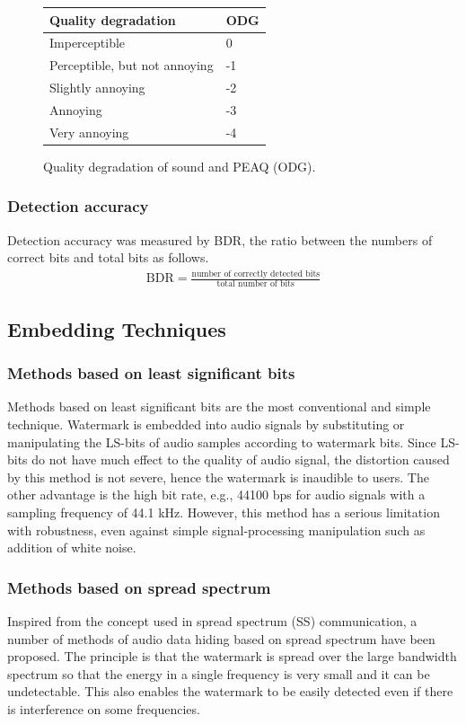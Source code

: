 \begin{figure}
\begin{center}
\begin{tabular}{ | m{6cm} | m{1cm} | } 
\hline
Quality degradation & ODG \\ 
\hline
Imperceptible & 0 \\ 
\hline
Perceptible, but not annoying & -1 \\ 
\hline
Slightly annoying & -2 \\ 
\hline
Annoying & -3 \\ 
\hline
Very annoying & -4 \\ 
\hline
\end{tabular}
\caption{Quality degradation of sound and PEAQ (ODG).}
\label{tab:PEAQ}
\end{center}
\end{figure}


\subsubsection*{Detection accuracy}
Detection accuracy was measured by BDR, the ratio between the numbers of correct bits and total bits as follows.
\begin{align}
\mbox{BDR} = \frac{\mbox{number of correctly detected bits}}{\mbox{total number of bits}}
\end{align}

\subsection{Embedding Techniques}
\subsubsection*{Methods based on least significant bits}
Methods based on least significant bits are the most conventional and simple technique. Watermark is embedded into audio signals by substituting or
manipulating the LS-bits of audio samples according to watermark bits. Since LS-bits do
not have much effect to the quality of audio signal, the distortion caused by this method
is not severe, hence the watermark is inaudible to users. The other advantage is the high
bit rate, e.g., 44100 bps for audio signals with a sampling frequency of 44.1 kHz. However,
this method has a serious limitation with robustness, even against simple signal-processing
manipulation such as addition of white noise.


\subsubsection*{Methods based on spread spectrum}
Inspired from the concept used in spread spectrum (SS) communication, a number of
methods of audio data hiding based on spread spectrum have been proposed. The principle
is that the watermark is spread over the large bandwidth spectrum so that the energy in a
single frequency is very small and it can be undetectable. This also enables the watermark
to be easily detected even if there is interference on some frequencies.
